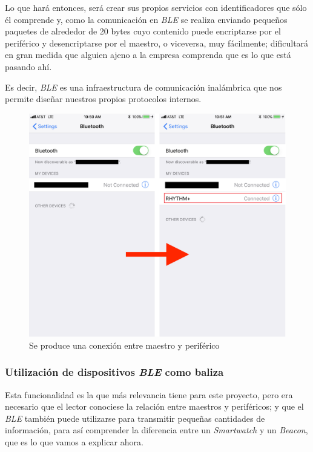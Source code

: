Lo que hará entonces, será crear sus propios servicios con identificadores que sólo él comprende y, como la comunicación en \textit{BLE} se realiza enviando pequeños paquetes de alrededor de 20 bytes cuyo contenido puede encriptarse por el periférico y desencriptarse por el maestro, o viceversa, muy fácilmente; dificultará en gran medida que alguien ajeno a la empresa comprenda que es lo que está pasando ahí.

Es decir, \textit{BLE} es una infraestructura de comunicación inalámbrica que nos permite diseñar nuestros propios protocolos internos.

\begin{figure}[t]
\centering
\includegraphics[scale=0.1]{figures/connect-ble.png}
\caption{Se produce una conexión entre maestro y periférico}
\label{fig:connect-ble}
\end{figure}

\subsubsection{Utilización de dispositivos \textit{BLE} como baliza}
Esta funcionalidad es la que más relevancia tiene para este proyecto, pero era necesario que el lector conociese la relación entre maestros y periféricos; y que el \textit{BLE} también puede utilizarse para transmitir pequeñas cantidades de información, para así comprender la diferencia entre un \textit{Smartwatch} y un \textit{Beacon}, que es lo que vamos a explicar ahora.

